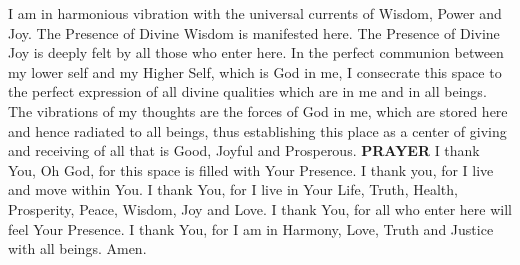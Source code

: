     I am in harmonious vibration with the universal
    currents of Wisdom, Power and Joy. The Presence
    of Divine Wisdom is manifested here. The Presence
    of Divine Joy is deeply felt by all those who enter
    here.
    \parspace
    In the perfect communion between my lower self and
    my Higher Self, which is God in me, I consecrate
    this space to the perfect expression of all divine
    qualities which are in me and in all beings.
    \parspace
    The vibrations of my thoughts are the forces of God
    in me, which are stored here and hence radiated to
    all beings, thus establishing this place as a center
    of giving and receiving of all that is Good, Joyful
    and Prosperous.
    \parspace
    \textbf{PRAYER}
    \parspace
    I thank You, Oh God, for this space is filled with
    Your Presence.
    \parspace
    I thank you, for I live and move within You.
    \parspace
    I thank You, for I live in Your Life, Truth, Health,
    Prosperity, Peace, Wisdom, Joy and Love.
    \parspace
    I thank You, for all who enter here will feel Your
    Presence.
    \parspace
    I thank You, for I am in Harmony, Love, Truth and
    Justice with all beings.
    \parspace
    Amen.
  \endverse
\endsong

\sclearpage
\begin{intersong}
\end{intersong}

